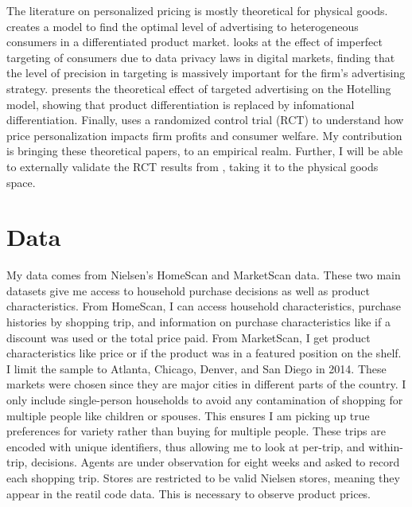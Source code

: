 \documentclass[11pt]{article}
\theoremstyle{definition}
\theoremstyle{remark}
\begin{document}
The literature on personalized pricing is mostly theoretical for physical goods. \citet{grossman_informative_1984} creates a model to find the optimal level of advertising to heterogeneous consumers in a differentiated product market. \cite{karle_imperfect_nodate} looks at the effect of imperfect targeting of consumers due to data privacy laws in digital markets, finding that the level of precision in targeting is massively important for the firm's advertising strategy. \cite{moorthy_targeting_2023} presents the theoretical effect of targeted advertising on the Hotelling model, showing that product differentiation is replaced by infomational differentiation. Finally, \cite{dube_personalized_2023} uses a randomized control trial (RCT) to understand how price personalization impacts firm profits and consumer welfare. My contribution is bringing these theoretical papers, to an empirical realm. Further, I will be able to externally validate the RCT results from \cite{dube_personalized_2023}, taking it to the physical goods space.

\section{Data}

    My data comes from Nielsen's HomeScan and MarketScan data. These two main datasets give me access to household purchase decisions as well as product characteristics. From HomeScan, I can access household characteristics, purchase histories by shopping trip, and information on purchase characteristics like if a discount was used or the total price paid. From MarketScan, I get product characteristics like price or if the product was in a featured position on the shelf. I limit the sample to Atlanta, Chicago, Denver, and San Diego in 2014. These markets were chosen since they are major cities in different parts of the country. I only include single-person households to avoid any contamination of shopping for multiple people like children or spouses. This ensures I am picking up true preferences for variety rather than buying for multiple people. These trips are encoded with unique identifiers, thus allowing me to look at per-trip, and within-trip, decisions. Agents are under observation for eight weeks and asked to record each shopping trip. Stores are restricted to be valid Nielsen stores, meaning they appear in the reatil code data. This is necessary to observe product prices.
    
\end{document}
